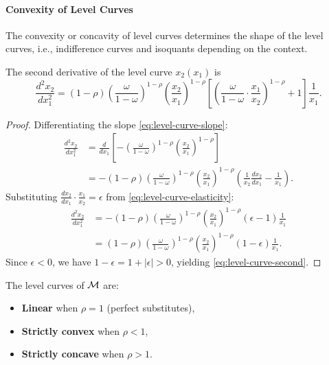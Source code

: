 \paragraph{Convexity of Level Curves}

The convexity or concavity of level curves determines the shape of the level curves, i.e., indifference curves and isoquants depending on the context.
\begin{proposition}
\label{prop:level-curve-convexity}
The second derivative of the level curve $x_2(x_1)$ is
\begin{equation}
\label{eq:level-curve-second}
\frac{d^2 x_2}{dx_1^2} = (1-\rho) \left( \frac{\omega}{1-\omega} \right)^{1-\rho} \left( \frac{x_2}{x_1} \right)^{1-\rho} \left[ \left( \frac{\omega}{1-\omega} \cdot \frac{x_1}{x_2} \right)^{1-\rho} + 1 \right] \frac{1}{x_1}.
\end{equation}
\end{proposition}

\begin{proof}
Differentiating the slope \cref{eq:level-curve-slope}:
\begin{align*}
\frac{d^2 x_2}{dx_1^2} 
&= \frac{d}{dx_1} \left[ -\left( \frac{\omega}{1-\omega} \right)^{1-\rho} \left( \frac{x_2}{x_1} \right)^{1-\rho} \right] \\
&= -(1-\rho) \left( \frac{\omega}{1-\omega} \right)^{1-\rho} \left( \frac{x_2}{x_1} \right)^{1-\rho} \left( \frac{1}{x_2}\frac{dx_2}{dx_1} - \frac{1}{x_1} \right).
\end{align*}
Substituting $\frac{dx_2}{dx_1} \cdot \frac{x_1}{x_2} = \epsilon$ from \cref{eq:level-curve-elasticity}:
\begin{align*}
\frac{d^2 x_2}{dx_1^2} 
&= -(1-\rho) \left( \frac{\omega}{1-\omega} \right)^{1-\rho} \left( \frac{x_2}{x_1} \right)^{1-\rho} \left( \epsilon - 1 \right) \frac{1}{x_1} \\
&= (1-\rho) \left( \frac{\omega}{1-\omega} \right)^{1-\rho} \left( \frac{x_2}{x_1} \right)^{1-\rho} \left( 1 - \epsilon \right) \frac{1}{x_1}.
\end{align*}
Since $\epsilon < 0$, we have $1 - \epsilon = 1 + |\epsilon| > 0$, yielding \cref{eq:level-curve-second}.
\end{proof}

\begin{proposition}
\label{prop:level-curve-shape}
The level curves of $\mathcal{M}$ are:
\begin{itemize}[leftmargin=1.5em]
    \item \textbf{Linear} when $\rho = 1$ (perfect substitutes),
    \item \textbf{Strictly convex} when $\rho < 1$,
    \item \textbf{Strictly concave} when $\rho > 1$.
\end{itemize}
\end{proposition}

